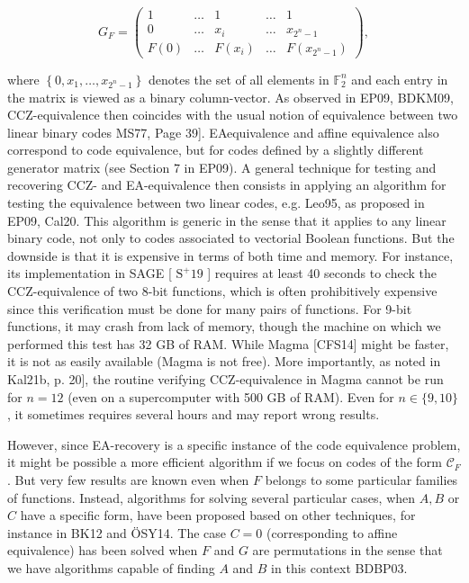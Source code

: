 \documentclass[10pt]{article}
\begin{document}
$$
G_{F}=\left(\begin{array}{ccccc}
1 & \ldots & 1 & \ldots & 1 \\
0 & \ldots & x_{i} & \ldots & x_{2^{n}-1} \\
F(0) & \ldots & F\left(x_{i}\right) & \ldots & F\left(x_{2^{n}-1}\right)
\end{array}\right),
$$

where $\left\{0, x_{1}, \ldots, x_{2^{n}-1}\right\}$ denotes the set of all elements in $\mathbb{F}_{2}^{n}$ and each entry in the matrix is viewed as a binary column-vector. As observed in EP09, BDKM09, CCZ-equivalence then coincides with the usual notion of equivalence between two linear binary codes MS77, Page 39]. EAequivalence and affine equivalence also correspond to code equivalence, but for codes defined by a slightly different generator matrix (see Section 7 in EP09). A general technique for testing and recovering CCZ- and EA-equivalence then consists in applying an algorithm for testing the equivalence between two linear codes, e.g. Leo95, as proposed in EP09, Cal20. This algorithm is generic in the sense that it applies to any linear binary code, not only to codes associated to vectorial Boolean functions. But the downside is that it is expensive in terms of both time and memory. For instance, its implementation in SAGE [ $\mathrm{S}^{+} 19$ ] requires at least 40 seconds to check the CCZ-equivalence of two 8-bit functions, which is often prohibitively expensive since this verification must be done for many pairs of functions. For 9-bit functions, it may crash from lack of memory, though the machine on which we performed this test has 32 GB of RAM. While Magma [CFS14] might be faster, it is not as easily available (Magma is not free). More importantly, as noted in Kal21b, p. 20], the routine verifying CCZ-equivalence in Magma cannot be run for $n=12$ (even on a supercomputer with 500 GB of RAM). Even for $n \in\{9,10\}$, it sometimes requires several hours and may report wrong results.

However, since EA-recovery is a specific instance of the code equivalence problem, it might be possible a more efficient algorithm if we focus on codes of the form $\mathcal{C}_{F}$. But very few results are known even when $F$ belongs to some particular families of functions. Instead, algorithms for solving several particular cases, when $A, B$ or $C$ have a specific form, have been proposed based on other techniques, for instance in BK12 and ÖSY14. The case $C=0$ (corresponding to affine equivalence) has been solved when $F$ and $G$ are permutations in the sense that we have algorithms capable of finding $A$ and $B$ in this context BDBP03.
\end{document}
